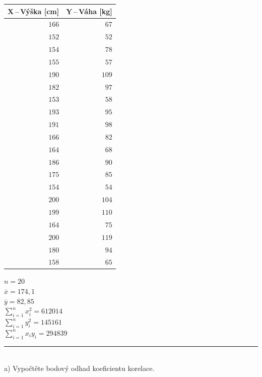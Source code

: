 \documentclass[pdftex, 11pt, a4paper, titlepage]{article}
\begin{document}
    \begin{table}[H]
		\begin{tabular}{|r|r|}
			\multicolumn{1}{c}{\textbf{$ \boldsymbol{X} $\,--\,Výška [cm]}}
			& \multicolumn{1}{c}{\textbf{$ \boldsymbol{Y} $\,--\,Váha [kg]}}
			\\ \hline

			$ 166 $ & $ 67 $ \\ \hline
			$ 152 $ & $ 52 $ \\ \hline
			$ 154 $ & $ 78 $ \\ \hline
			$ 155 $ & $ 57 $ \\ \hline
			$ 190 $ & $ 109 $ \\ \hline
			$ 182 $ & $ 97 $ \\ \hline
			$ 153 $ & $ 58 $ \\ \hline
			$ 193 $ & $ 95 $ \\ \hline
			$ 191 $ & $ 98 $ \\ \hline
			$ 166 $ & $ 82 $ \\ \hline
			$ 164 $ & $ 68 $ \\ \hline
			$ 186 $ & $ 90 $ \\ \hline
			$ 175 $ & $ 85 $ \\ \hline
			$ 154 $ & $ 54 $ \\ \hline
			$ 200 $ & $ 104 $ \\ \hline
			$ 199 $ & $ 110 $ \\ \hline
			$ 164 $ & $ 75 $ \\ \hline
			$ 200 $ & $ 119 $ \\ \hline
			$ 180 $ & $ 94 $ \\ \hline
			$ 158 $ & $ 65 $ \\ \hline
		\end{tabular}
    \end{table}
    
    \noindent
    $n = 20$\\
    $\overline{x} = 174,1$\\
    $\overline{y} = 82,85$\\
    $\sum\limits_{i=1}^{n}x_i^2 = 612014$\\
    $\sum\limits_{i=1}^{n}y_i^2 = 145161$\\
    $\sum\limits_{i=1}^{n}x_iy_i = 294839$\\

    \noindent\rule{\linewidth}{0.4pt}\\

    a) Vypočtěte bodový odhad koeficientu korelace.\\
    
\end{document}
